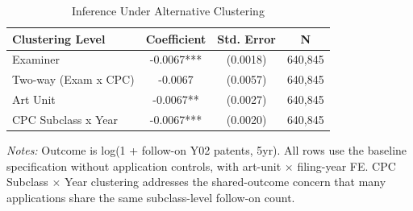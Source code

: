 \begin{table}[htbp]
\centering
\caption{Inference Under Alternative Clustering}
\label{tab:cluster}
\begin{tabular}{lccc}
\hline\hline
Clustering Level & Coefficient & Std. Error & N \\
\hline
Examiner & -0.0067*** & (0.0018) & 640,845 \\
Two-way (Exam x CPC) & -0.0067 & (0.0057) & 640,845 \\
Art Unit & -0.0067** & (0.0027) & 640,845 \\
CPC Subclass x Year & -0.0067*** & (0.0020) & 640,845 \\
\hline\hline
\end{tabular}
\begin{minipage}{0.8\textwidth}
\footnotesize
\textit{Notes:} Outcome is log(1 + follow-on Y02 patents, 5yr). All rows use the baseline specification without application controls, with art-unit $\times$ filing-year FE. CPC Subclass $\times$ Year clustering addresses the shared-outcome concern that many applications share the same subclass-level follow-on count.
\end{minipage}
\end{table}
